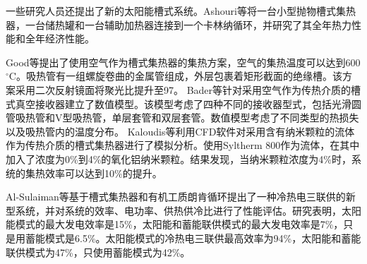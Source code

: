 一些研究人员还提出了新的太阳能槽式系统。Ashouri等\cite{Ashouri2015}将一台小型抛物槽式集热器，一台储热罐和一台辅助加热器连接到一个卡林纳循环，并研究了其全年热力性能和全年经济性能。

Good等提出了使用空气作为槽式集热器的集热方案，空气的集热温度可以达到600$\mathrm{^\circ C}$。吸热管有一组螺旋卷曲的金属管组成，外层包裹着矩形截面的绝缘槽。该方案采用二次反射镜面将聚光比提升至97。
Bader等\cite{Bader2015}针对采用空气作为传热介质的槽式真空接收器建立了数值模型。该模型考虑了四种不同的接收器型式，包括光滑圆管吸热管和V型吸热管，单层套管和双层套管。数值模型考虑了不同类型的热损失以及吸热管内的温度分布。
Kaloudis等\cite{Kaloudis2016}利用CFD软件对采用含有纳米颗粒的流体作为传热介质的槽式集热器进行了模拟分析。使用Syltherm 800作为流体，在其中加入了浓度为0\%到4\%的氧化铝纳米颗粒。结果发现，当纳米颗粒浓度为4\%时，系统的集热效率可以达到10\%的提升。

Al-Sulaiman等\cite{AlSulaiman2012}基于槽式集热器和有机工质朗肯循环提出了一种冷热电三联供的新型系统，并对系统的效率、电功率、供热供冷比进行了性能评估。研究表明，太阳能模式的最大发电效率是15\%，太阳能和蓄能联供模式的最大发电效率是7\%，只是用蓄能模式是6.5\%。太阳能模式的冷热电三联供最高效率为94\%，太阳能和蓄能联供模式为47\%，只使用蓄能模式为42\%。

